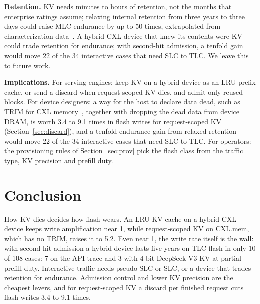 \documentclass[acmsmall,screen,review]{acmart}
\begin{document}
\textbf{Retention.} KV needs minutes to hours of retention, not the months that enterprise ratings
assume; relaxing internal retention from three years to three days could raise MLC endurance by up
to 50 times, extrapolated from characterization data~\cite{warm}. A hybrid CXL device that knew its
contents were KV could trade retention for endurance; with second-hit admission, a tenfold gain
would move 22 of the 34 interactive cases that need SLC to TLC. We leave this to future work.

\textbf{Implications.} For serving engines: keep KV on a hybrid device as an LRU prefix cache, or
send a discard when request-scoped KV dies, and admit only reused blocks. For device
designers: a way for the host to declare data dead, such as TRIM for CXL memory~\cite{trimcxl},
together with dropping the dead data from device DRAM, is worth 3.4 to 9.1 times in flash writes for
request-scoped KV (Section~\ref{sec:discard}), and a
tenfold endurance gain from relaxed retention would move 22 of the 34 interactive cases that need SLC to TLC. For operators: the provisioning
rules of Section~\ref{sec:prov} pick the flash class from the traffic type, KV precision and
prefill duty.

\section{Conclusion}
How KV dies decides how flash wears. An LRU KV cache on a hybrid CXL device keeps write
amplification near 1, while request-scoped KV on CXL.mem, which has no TRIM, raises it to 5.2.
Even near 1, the write rate itself is the wall: with second-hit admission a hybrid device lasts five
years on TLC flash in only 10 of 108 cases: 7 on the API trace and 3 with 4-bit DeepSeek-V3 KV at partial
prefill duty. Interactive traffic needs pseudo-SLC or SLC, or a device that trades retention for endurance.
Admission control and lower KV precision are the cheapest levers, and for request-scoped KV a
discard per finished request cuts flash writes 3.4 to 9.1 times.



\end{document}
